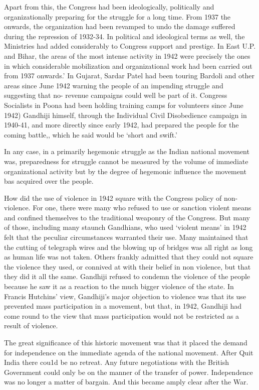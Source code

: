 Apart from this, the Congress had been ideologically, politically and organizationally preparing for the struggle for a long time. From 1937 the onwards, the organization had been revamped to undo the damage suffered during the repression of 1932-34. In political and ideological terms as well, the Ministries had added considerably to Congress support and prestige. In East U.P. and Bihar, the areas of the most intense activity in 1942 were precisely the ones in which considerable mobilization and organizational work had been carried out from 1937 onwards.’ In Gujarat, Sardar Patel had been touring Bardoli and other areas since June 1942 warning the people of an impending struggle and suggesting that no- revenue campaigns could well be part of it. Congress Socialists in Poona had been holding training camps for volunteers since June 1942) Gandhiji himself, through the Individual Civil Disobedience campaign in 1940-41, and more directly since early 1942, had prepared the people for the coming battle,, which he said would be ‘short and swift.’

In any case, in a primarily hegemonic struggle as the Indian national movement was, preparedness for struggle cannot be measured by the volume of immediate organizational activity but by the degree of hegemonic influence the movement bas acquired over the people.

How did the use of violence in 1942 square with the Congress policy of non-violence. For one, there were many who refused to use or sanction violent means and confined themselves to the traditional weaponry of the Congress. But many of those, including many staunch Gandhians, who used ‘violent means’ in 1942 felt that the peculiar circumstances warranted their use. Many maintained that the cutting of telegraph wires and the blowing up of bridges was all right as long as human life was not taken. Others frankly admitted that they could not square the violence they used, or connived at with their belief in non­ violence, but that they did it all the same. Gandhiji refused to condemn the violence of the people because he saw it as a reaction to the much bigger violence of the state. In Francis Hutchins’ view, Gandhiji’s major objection to violence was that its use prevented mass participation in a movement, but that, in 1942, Gandhiji had come round to the view that mass participation would not be restricted as a result of violence.

The great significance of this historic movement was that it placed the demand for independence on the immediate agenda of the national movement. After Quit India there cou1d be no retreat. Any future negotiations with the British Government could only be on the manner of the transfer of power. Independence was no longer a matter of bargain. And this became amply clear after the War.


